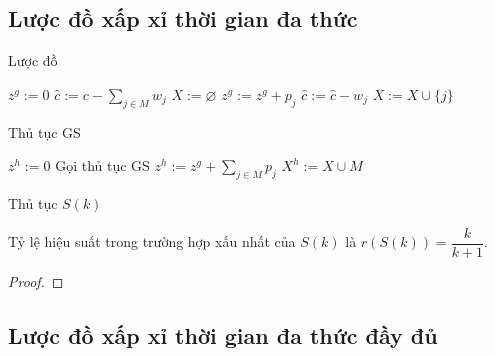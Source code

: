 \subsection{Lược đồ xấp xỉ thời gian đa thức}

Lược đồ 

\begin{algorithm}[!ht]
    \DontPrintSemicolon
    \vspace{1em}
    \vspace{1em}
    $z^g:= 0$\;
    $\hat{c}:= c - \sum_{j \in M}w_j$\;
    $X:= \varnothing$\;
    {
        {
            $z^g:= z^g + p_j$\;
            $\hat{c} := \hat{c} - w_j$\;
            $X := X \cup \{j\}$\; 
        }
    }
    \caption{Thủ tục GS}
    \label{algo:gs}
\end{algorithm}


\begin{algorithm}[!ht]
    \DontPrintSemicolon
    \vspace{1em}
    \vspace{1em}
    $z^h := 0$\;
    {
        Gọi thủ tục GS\;
        {
            $z^h := z^g + \sum_{j\in M}p_j$\;
            $X^h := X \cup M$\; 
        }
    }
    \caption{Thủ tục $S(k)$}
    \label{algo:sk}
\end{algorithm}

\begin{theorem}
    Tỷ lệ hiệu suất trong trường hợp xấu nhất của $S(k)$ là $r(S(k)) = \dfrac{k}{k+1}$.
\end{theorem}
\begin{proof}
    
\end{proof}

\begin{example}
    
\end{example}

\subsection{Lược đồ xấp xỉ thời gian đa thức đầy đủ}

